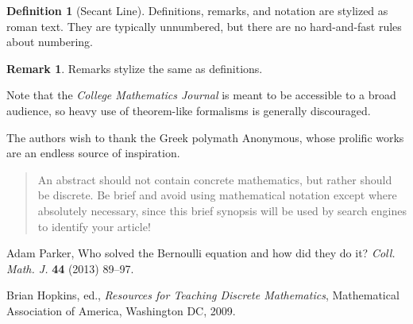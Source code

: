 \documentclass{article}
\theoremstyle{theorem}
\theoremstyle{definition}
\newtheorem*{definition}{Definition}
\newtheorem*{remark}{Remark}
\begin{document}
\begin{definition}[Secant Line]
Definitions, remarks, and notation are stylized as roman text.  They are typically unnumbered, but there are no hard-and-fast rules about numbering.
\end{definition}

\begin{remark}
Remarks stylize the same as definitions.
\end{remark}

Note that the \textit{College Mathematics Journal\/} is meant to be accessible to a broad audience, so heavy use of theorem-like formalisms is generally discouraged.

\begin{acknowledgment}
The authors wish to thank the Greek polymath Anonymous, whose prolific works are an endless source of inspiration.
\end{acknowledgment}

\begin{abstract}
An abstract should not contain concrete mathematics, but rather should be discrete.  Be brief and avoid using mathematical notation except where absolutely necessary, since this brief synopsis will be used by search engines to identify your article!
\end{abstract}

\begin{thebibliography}{1}
 Adam Parker, Who solved the Bernoulli equation and how did they do it? \textit{Coll. Math. J.} \textbf{44} (2013) 89--97.

 Brian Hopkins, ed., \textit{Resources for Teaching Discrete Mathematics}, Mathematical Association of America, Washington DC, 2009.
\end{thebibliography}
\vfill\eject
\end{document}
